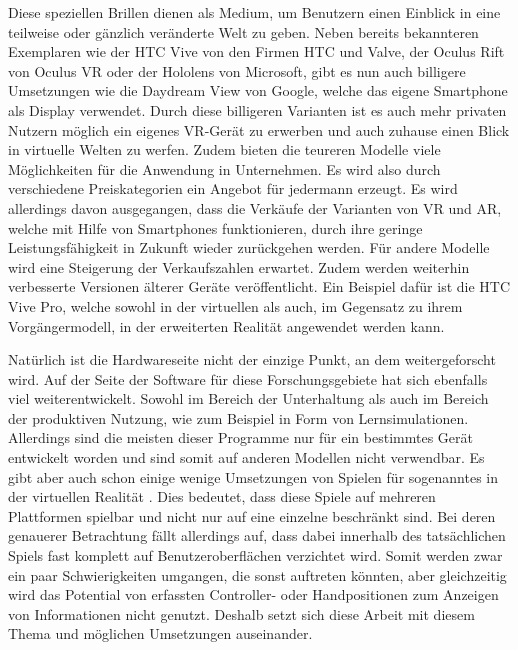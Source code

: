 	Diese speziellen Brillen dienen als Medium, um Benutzern einen Einblick in eine teilweise oder gänzlich veränderte Welt zu geben.
	Neben bereits bekannteren Exemplaren wie der HTC Vive von den Firmen HTC und Valve, der Oculus Rift von Oculus VR oder der Hololens von Microsoft, gibt es nun auch billigere Umsetzungen wie die Daydream View von Google, welche das eigene Smartphone als Display verwendet. 
	Durch diese billigeren Varianten ist es auch mehr privaten Nutzern möglich ein eigenes VR-Gerät zu erwerben und auch zuhause einen Blick in virtuelle Welten zu werfen. Zudem bieten die teureren Modelle viele Möglichkeiten für die Anwendung in Unternehmen. Es wird also durch verschiedene Preiskategorien ein Angebot für jedermann erzeugt.
	Es wird allerdings davon ausgegangen, dass die Verkäufe der Varianten von VR und AR, welche mit Hilfe von Smartphones funktionieren, durch ihre geringe Leistungsfähigkeit in Zukunft wieder zurückgehen werden. Für andere Modelle wird eine Steigerung der Verkaufszahlen erwartet.
	Zudem werden weiterhin verbesserte Versionen älterer Geräte veröffentlicht. Ein Beispiel dafür ist die HTC Vive Pro, welche sowohl in der virtuellen als auch, im Gegensatz zu ihrem Vorgängermodell, in der erweiterten Realität angewendet werden kann.

	Natürlich ist die Hardwareseite nicht der einzige Punkt, an dem weitergeforscht wird. Auf der Seite der Software für diese Forschungsgebiete hat sich ebenfalls viel weiterentwickelt. Sowohl im Bereich der Unterhaltung als auch im Bereich der produktiven Nutzung, wie zum Beispiel in Form von Lernsimulationen. Allerdings sind die meisten dieser Programme nur für ein bestimmtes Gerät entwickelt worden und sind somit auf anderen Modellen nicht verwendbar. Es gibt aber auch schon einige wenige Umsetzungen von Spielen für sogenanntes  in der virtuellen Realität . Dies bedeutet, dass diese Spiele auf mehreren Plattformen spielbar und nicht nur auf eine einzelne beschränkt sind. Bei deren genauerer Betrachtung fällt allerdings auf, dass dabei innerhalb des tatsächlichen Spiels fast komplett auf Benutzeroberflächen verzichtet wird. Somit werden zwar ein paar Schwierigkeiten umgangen, die sonst auftreten könnten, aber gleichzeitig wird das Potential von erfassten Controller- oder Handpositionen zum Anzeigen von Informationen nicht genutzt. Deshalb setzt sich diese Arbeit mit diesem Thema und möglichen Umsetzungen auseinander.
	
